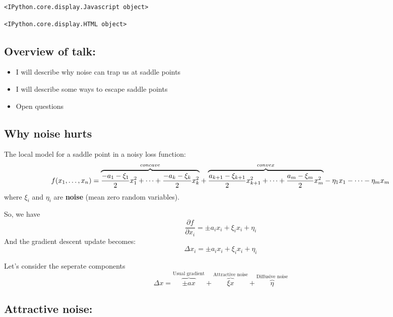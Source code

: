 \documentclass[11pt]{article}
\providecommand{\tightlist}{%
      \setlength{\itemsep}{0pt}\setlength{\parskip}{0pt}}
\begin{document}
    
    \begin{verbatim}
<IPython.core.display.Javascript object>
    \end{verbatim}

    
    
    \begin{verbatim}
<IPython.core.display.HTML object>
    \end{verbatim}

    
    \hypertarget{overview-of-talk}{%
\subsection{Overview of talk:}\label{overview-of-talk}}

\begin{itemize}
\tightlist
\item
  I will describe why noise can trap us at saddle points
\item
  I will describe some ways to escape saddle points
\item
  Open questions
\end{itemize}

    \hypertarget{why-noise-hurts}{%
\subsection{Why noise hurts}\label{why-noise-hurts}}

    The local model for a saddle point in a noisy loss function:
\[f(x_1,\dots,x_n) = \overset{concave}
{\overbrace{\frac{-a_1-\xi_1}{2}x_1^2+\dots +\frac{-a_k-\xi_k}{2}x_k^2}}
+ \overset{convex}{\overbrace{\frac{a_{k+1}-\xi_{k+1}}{2}x_{k+1}^2+\dots+\frac{a_m-\xi_m}{2}x_m^2}}\\
-\eta_1x_1-\cdots-\eta_mx_m
\] where \(\xi_i\) and \(\eta_i\) are \textbf{noise} (mean zero random
variables).

    So, we have
\[\frac{\partial f}{\partial x_i} = \pm a_ix_i +\xi_ix_i+\eta_i\] And
the gradient descent update becomes:
\[\Delta x_i =\pm a_i x_i+ \xi_i x_i+\eta_i\]

    Let's consider the seperate components \[ \Delta x =
    \overset{\text{Usual gradient}}{\overbrace{\pm ax}} 
    +\overset{\text{Attractive noise}}{\overbrace{\xi x}}+\overset{\text{Diffusive noise}}{\overbrace{\eta}}\]

    \hypertarget{attractive-noise}{%
\subsection{Attractive noise:}\label{attractive-noise}}
\end{document}
